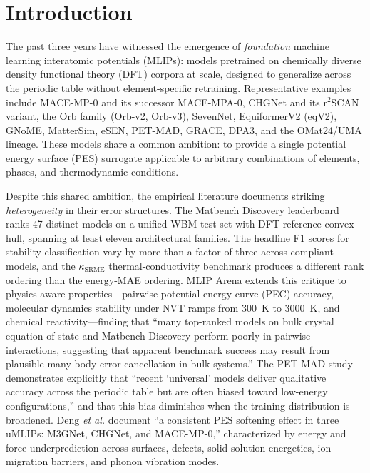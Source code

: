 \section{Introduction}\label{sec:intro}

The past three years have witnessed the emergence of \emph{foundation} machine learning interatomic potentials (MLIPs): models pretrained on chemically diverse density functional theory (DFT) corpora at scale, designed to generalize across the periodic table without element-specific retraining\cite{batatia2024mace, deng2023chgnet, yang2024mattersim, barroso2024omat24}. Representative examples include MACE-MP-0 and its successor MACE-MPA-0\cite{batatia2024mace}, CHGNet and its r$^2$SCAN variant\cite{deng2023chgnet}, the Orb family (Orb-v2, Orb-v3)\cite{qian2023orb}, SevenNet\cite{park2024sevennet}, EquiformerV2 (eqV2)\cite{liao2024equiformerv2}, GNoME\cite{merchant2023gnome}, MatterSim\cite{yang2024mattersim}, eSEN\cite{om枯萎}, PET-MAD\cite{mazitov2025petmad}, GRACE\cite{bochkarev2024grace}, DPA3\cite{zhang2024dpa3}, and the OMat24/UMA lineage\cite{barroso2024omat24}. These models share a common ambition: to provide a single potential energy surface (PES) surrogate applicable to arbitrary combinations of elements, phases, and thermodynamic conditions.

Despite this shared ambition, the empirical literature documents striking \emph{heterogeneity} in their error structures. The Matbench Discovery leaderboard\cite{riebesell2025matbench} ranks 47 distinct models on a unified WBM test set with DFT reference convex hull, spanning at least eleven architectural families. The headline F1 scores for stability classification vary by more than a factor of three across compliant models, and the $\kappa_{\text{SRME}}$ thermal-conductivity benchmark\cite{pota2024kappa} produces a different rank ordering than the energy-MAE ordering. MLIP Arena\cite{chiang2025mliparena} extends this critique to physics-aware properties---pairwise potential energy curve (PEC) accuracy, molecular dynamics stability under NVT ramps from 300~K to 3000~K, and chemical reactivity---finding that ``many top-ranked models on bulk crystal equation of state and Matbench Discovery perform poorly in pairwise interactions, suggesting that apparent benchmark success may result from plausible many-body error cancellation in bulk systems.''\cite{chiang2025mliparena} The PET-MAD study\cite{mazitov2025petmad} demonstrates explicitly that ``recent `universal' models deliver qualitative accuracy across the periodic table but are often biased toward low-energy configurations,'' and that this bias diminishes when the training distribution is broadened. Deng \emph{et al.}\cite{deng2025systematic} document ``a consistent PES softening effect in three uMLIPs: M3GNet, CHGNet, and MACE-MP-0,'' characterized by energy and force underprediction across surfaces, defects, solid-solution energetics, ion migration barriers, and phonon vibration modes.

